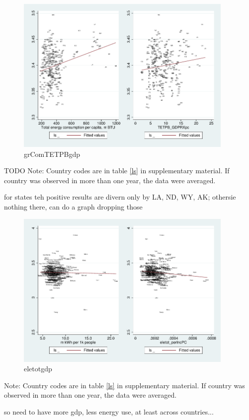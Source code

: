 \documentclass[10pt, letterpaper]{article}
\begin{document}
\begin{spacing}{1.4}
\begin{figure}[H]
 \includegraphics[height=3in]{graphsAndTables/grComTETPB_gdp.pdf}\centering
\caption{grComTETPBgdp}\label{grComTETPBgdp}
\end{figure}
{\scriptsize TODO Note: Country codes are in table \ref{ls} in supplementary
  material. If country was observed in more than one year, the data were averaged.}

for states teh positive results are divern only by LA, ND, WY, AK; othersie
nothing there, can do a graph dropping those

\begin{figure}[H]
 \includegraphics[height=3in]{graphsAndTables/eletot_gdp.pdf}\centering
\caption{eletotgdp}\label{eletotgdp}
\end{figure}
{\scriptsize Note: Country codes are in table \ref{ls} in supplementary
  material. If country was observed in more than one year, the data were averaged.}




so need to have more gdp, less energy use, at least across countries...


\end{spacing}
\end{document}
